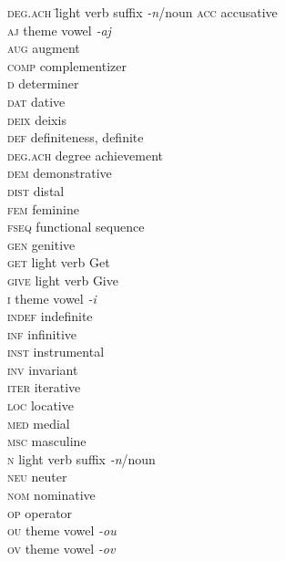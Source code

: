 
\begin{multicols}{2}
\begin{tabbing}
\textsc{deg.ach} \hspace{1em} \= light verb suffix \textit{-n}\slash noun\kill
\textsc{acc}		\>	accusative \\
\textsc{aj}			\>	theme vowel \textit{-aj}\\
\textsc{aug}		\>	augment\\
\textsc{comp}		\>	complementizer\\
\textsc{d}			\>	determiner\\
\textsc{dat}		\>	dative\\
\textsc{deix}		\>	deixis\\
\textsc{def}		\>	definiteness, definite\\
\textsc{deg.ach}	\>	degree achievement\\
\textsc{dem}		\>	demonstrative \\
\textsc{dist}		\>	distal\\
\textsc{fem}		\>	feminine\\
\textsc{fseq}		\>	functional sequence\\
\textsc{gen}		\>	genitive \\
\textsc{get}		\>	light verb Get\\
\textsc{give}		\>	light verb Give\\
\textsc{i}			\>	theme vowel \textit{-i}\\
\textsc{indef}		\>	indefinite\\
\textsc{inf}		\>	infinitive\\
\textsc{inst}		\>	instrumental\\
\textsc{inv}		\>	invariant\\
\textsc{iter}		\>	iterative\\
\textsc{loc}		\>	locative\\
\textsc{med}		\>	medial\\
\textsc{msc}		\>	masculine\\
\textsc{n}			\>	light verb suffix \textit{-n}\slash noun\\
\textsc{neu}		\>	neuter\\
\textsc{nom} 		\>	nominative \\
 \textsc{op}		\>	operator\\
 \textsc{ou}		\>	theme vowel \textit{-ou}\\
 \textsc{ov}		\>	theme vowel \textit{-ov}\\

\end{tabbing}
\end{multicols}
